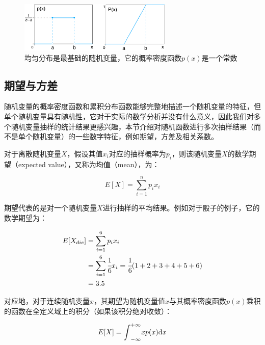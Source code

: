 \begin{figure}
	\sidecaption
	\includegraphics[width=0.65\textwidth]{figures/mc/uniform-cdf}
	\caption{均匀分布是最基础的随机变量，它的概率密度函数$p(x)$是一个常数}
	\label{f:mc-uniform-cdf}
\end{figure}







\subsection{期望与方差}
随机变量的概率密度函数和累积分布函数能够完整地描述一个随机变量的特征，但单个随机变量具有随机性，它对于实际的数学分析并没有什么意义，因此我们对多个随机变量抽样的统计结果更感兴趣，本节介绍对随机函数进行多次抽样结果（而不是单个随机变量）的一些数字特征，例如期望，方差及相关系数。

对于离散随机变量$X$，假设其值$x_i$对应的抽样概率为$p_i$，则该随机变量$X$的数学期望（expected value），又称为均值（mean），为：

\begin{equation}\label{eq:mc-expected-value}
	E[X]=\sum_{i=1}^{n}p_i x_i
\end{equation} 

\noindent 期望代表的是对一个随机变量$X$进行抽样的平均结果。例如对于骰子的例子，它的数学期望为：

\begin{equation}
	\begin{aligned}
		E[X_{die}]&=\sum_{i=1}^{6}p_i x_i\\
		&=\sum_{i=1}^{6} \cfrac{1}{6}x_i = \cfrac{1}{6}(1+2+3+4+5+6)\\
		&=3.5
	\end{aligned}
\end{equation}

\noindent 对应地，对于连续随机变量$x$，其期望为随机变量值$x$与其概率密度函数$p(x)$乘积的函数在全定义域上的积分（如果该积分绝对收敛）：

\begin{equation}\label{eq:mc-continuous-e}
	E[X]={\rm \int}_{-\infty}^{+\infty}xp(x){\rm d}x
\end{equation}

